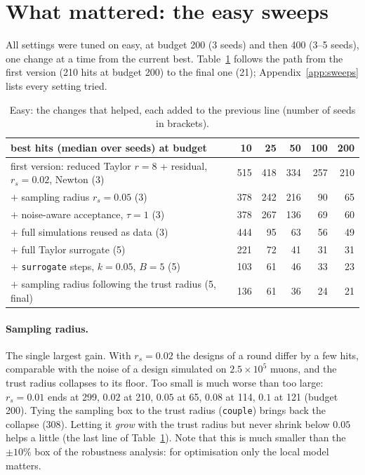 \documentclass[11pt,a4paper]{article}
\begin{document}
\section{What mattered: the easy sweeps}

All settings were tuned on easy, at budget 200 (3 seeds) and then 400 (3--5 seeds), one change
at a time from the current best. Table~\ref{tab:steps} follows the path from the first version
(210 hits at budget 200) to the final one (21); Appendix~\ref{app:sweeps} lists every setting
tried.

\begin{table}[h]\centering\small
\begin{tabular}{lrrrrr}
\toprule
best hits (median over seeds) at budget & 10 & 25 & 50 & 100 & 200 \\
\midrule
first version: reduced Taylor $r{=}8$ + residual, $r_s=0.02$, Newton (3) & 515 & 418 & 334 & 257 & 210 \\
$+$ sampling radius $r_s=0.05$ (3) & 378 & 242 & 216 & 90 & 65 \\
$+$ noise-aware acceptance, $\tau=1$ (3) & 378 & 267 & 136 & 69 & 60 \\
$+$ full simulations reused as data (3) & 444 & 95 & 63 & 56 & 49 \\
$+$ full Taylor surrogate (5) & 221 & 72 & 41 & 31 & 31 \\
$+$ \texttt{surrogate} steps, $k=0.05$, $B=5$ (5) & 103 & 61 & 46 & 33 & 23 \\
$+$ sampling radius following the trust radius (5, final) & 136 & 61 & 36 & 24 & 21 \\
\bottomrule
\end{tabular}
\caption{Easy: the changes that helped, each added to the previous line (number of seeds in
brackets).}
\label{tab:steps}
\end{table}

\paragraph{Sampling radius.} The single largest gain. With $r_s=0.02$ the designs of a round differ
by a few hits, comparable with the noise of a design simulated on $2.5\times10^5$ muons, and
the trust radius collapses to its floor. Too small is much worse than too large: $r_s=0.01$ ends at
299, $0.02$ at 210, $0.05$ at 65, $0.08$ at 114, $0.1$ at 121 (budget 200). Tying the sampling box
to the trust radius (\texttt{couple}) brings back the collapse (308). Letting it \emph{grow} with the
trust radius but never shrink below $0.05$ helps a little (the last line of
Table~\ref{tab:steps}). Note that this is much smaller than the $\pm10\%$ box of the robustness
analysis: for optimisation only the local model matters.
\end{document}
